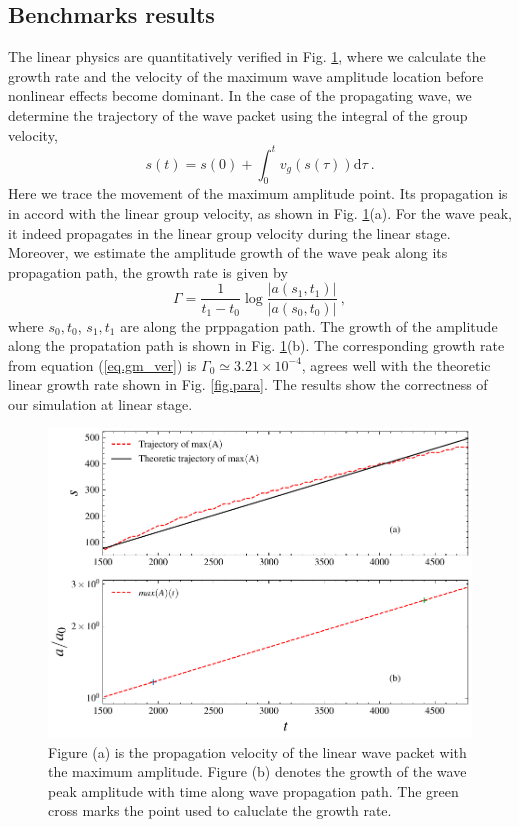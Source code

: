 \subsection{Benchmarks results}
The linear physics are quantitatively verified in Fig. \ref{fig.linear}, where we calculate the growth rate and the velocity of the maximum wave amplitude location before nonlinear effects become dominant. In the case of the propagating wave, we determine the trajectory of the wave packet using the integral of the group velocity,
\begin{equation}
    s(t) = s(0) + \int_0^{t} v_g(s(\tau)) \mathrm{d} \tau~.
\end{equation}
Here we trace the movement of the maximum amplitude point. Its propagation is in accord with the linear group velocity, as shown in Fig. \ref{fig.linear}(a). 
For the wave peak, it indeed propagates in the linear group velocity during the linear stage.
Moreover, we estimate the amplitude growth of the wave peak along its propagation path, the growth rate is given by \cite{nogi2022}
\begin{equation}\label{eq.gm_ver}
        \Gamma = \frac{1}{t_1-t_0}\log\frac{|a(s_1,t_1)|}{|a(s_0,t_0)|}~,
\end{equation}
where $s_0,t_0$, $s_1,t_1$ are along the prppagation path.
The growth of the amplitude along the propatation path is shown in Fig. \ref{fig.linear}(b). The corresponding growth rate from equation (\ref{eq.gm_ver}) is $\Gamma_0 \simeq 3.21\times10^{-4}$, agrees well with the theoretic linear growth rate shown in Fig. \ref{fig.para}.
The results show the correctness of our simulation at linear stage.
\begin{figure}[htbp]
    \centering
    \includegraphics[scale=0.5]{cpc_img/fig_linear.pdf}
    \caption{Figure (a) is the propagation velocity of the linear wave packet with the maximum amplitude. Figure (b) denotes the growth of the wave peak amplitude with time along wave propagation path. The green cross marks the point used to caluclate the growth rate.}
    \label{fig.linear}
\end{figure}

